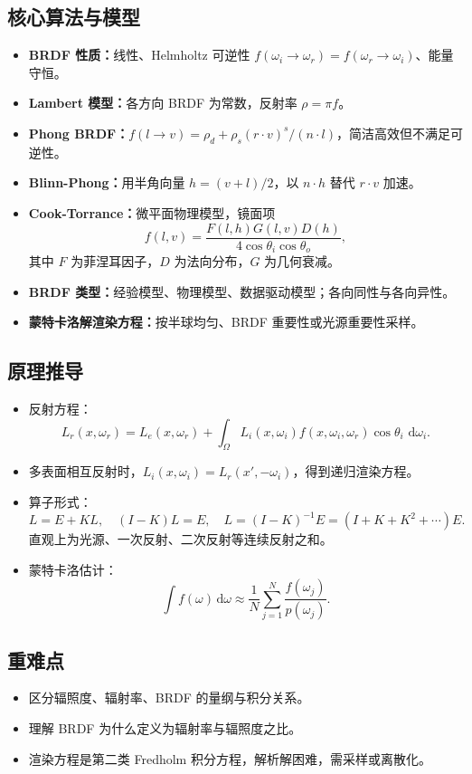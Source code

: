 \documentclass[UTF8,fontset=fandol,11pt]{ctexart}
\newcommand{\key}[1]{\textbf{#1}}
\newcommand{\dd}{\,\mathrm{d}}
\begin{document}
\subsection{核心算法与模型}
\begin{itemize}
  \item \key{BRDF 性质：}线性、Helmholtz 可逆性 $f(\omega_i\to\omega_r)=f(\omega_r\to\omega_i)$、能量守恒。
  \item \key{Lambert 模型：}各方向 BRDF 为常数，反射率 $\rho=\pi f$。
  \item \key{Phong BRDF：}$f(l\to v)=\rho_d+\rho_s(r\cdot v)^s/(n\cdot l)$，简洁高效但不满足可逆性。
  \item \key{Blinn-Phong：}用半角向量 $h=(v+l)/2$，以 $n\cdot h$ 替代 $r\cdot v$ 加速。
  \item \key{Cook-Torrance：}微平面物理模型，镜面项
  \[
    f(l,v)=\frac{F(l,h)G(l,v)D(h)}{4\cos\theta_i\cos\theta_o},
  \]
  其中 $F$ 为菲涅耳因子，$D$ 为法向分布，$G$ 为几何衰减。
  \item \key{BRDF 类型：}经验模型、物理模型、数据驱动模型；各向同性与各向异性。
  \item \key{蒙特卡洛解渲染方程：}按半球均匀、BRDF 重要性或光源重要性采样。
\end{itemize}
\subsection{原理推导}
\begin{itemize}
  \item 反射方程：
  \[
    L_r(x,\omega_r)=L_e(x,\omega_r)+\int_{\Omega}L_i(x,\omega_i)
    f(x,\omega_i,\omega_r)\cos\theta_i\,\dd\omega_i.
  \]
  \item 多表面相互反射时，$L_i(x,\omega_i)=L_r(x',-\omega_i)$，得到递归渲染方程。
  \item 算子形式：
  \[
    L=E+KL,\quad (I-K)L=E,\quad L=(I-K)^{-1}E=(I+K+K^2+\cdots)E.
  \]
  直观上为光源、一次反射、二次反射等连续反射之和。
  \item 蒙特卡洛估计：
  \[
    \int f(\omega)\dd\omega\approx \frac{1}{N}\sum_{j=1}^{N}\frac{f(\omega_j)}{p(\omega_j)}.
  \]
\end{itemize}
\subsection{重难点}
\begin{itemize}
  \item 区分辐照度、辐射率、BRDF 的量纲与积分关系。
  \item 理解 BRDF 为什么定义为辐射率与辐照度之比。
  \item 渲染方程是第二类 Fredholm 积分方程，解析解困难，需采样或离散化。
\end{itemize}
\end{document}
